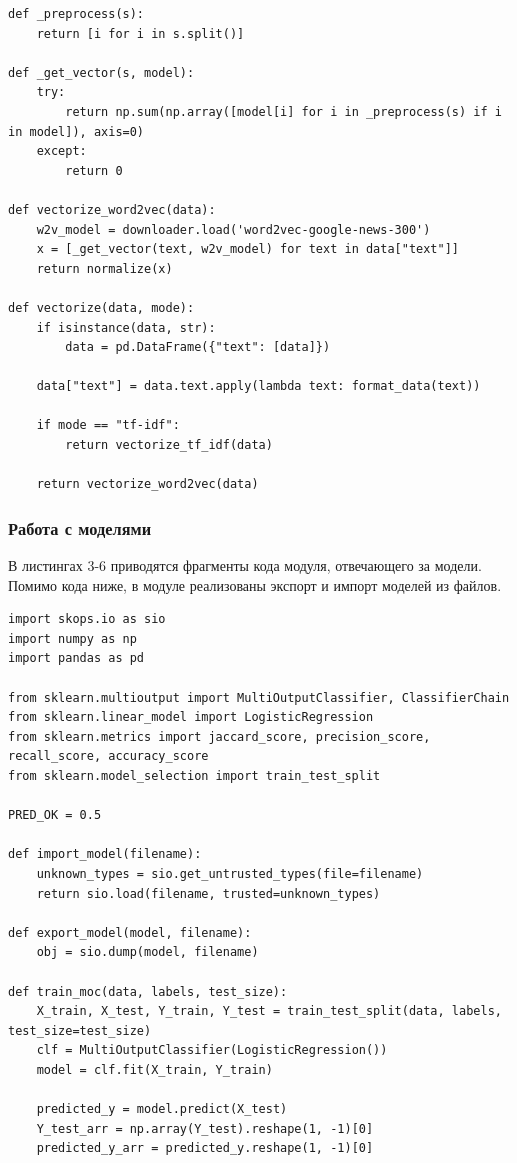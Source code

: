 \documentclass[a4paper, 12pt]{article}
\begin{document}
\begin{large}
\begin{lstlisting}[caption={Модуль обработки текста}]
def _preprocess(s):
    return [i for i in s.split()]

def _get_vector(s, model):
    try:
        return np.sum(np.array([model[i] for i in _preprocess(s) if i in model]), axis=0)
    except:
        return 0

def vectorize_word2vec(data):
    w2v_model = downloader.load('word2vec-google-news-300')
    x = [_get_vector(text, w2v_model) for text in data["text"]]
    return normalize(x)

def vectorize(data, mode):
    if isinstance(data, str):
        data = pd.DataFrame({"text": [data]})
    
    data["text"] = data.text.apply(lambda text: format_data(text))

    if mode == "tf-idf":
        return vectorize_tf_idf(data)

    return vectorize_word2vec(data)    
\end{lstlisting}

\subsubsection{Работа с моделями}
В листингах 3-6 приводятся фрагменты кода модуля, отвечающего за модели.
Помимо кода ниже, в модуле реализованы экспорт и импорт моделей из файлов.
\newpage
\begin{lstlisting}[caption={Обучение независимых классификаторов}]
import skops.io as sio
import numpy as np
import pandas as pd

from sklearn.multioutput import MultiOutputClassifier, ClassifierChain
from sklearn.linear_model import LogisticRegression
from sklearn.metrics import jaccard_score, precision_score, recall_score, accuracy_score
from sklearn.model_selection import train_test_split

PRED_OK = 0.5

def import_model(filename):
    unknown_types = sio.get_untrusted_types(file=filename)
    return sio.load(filename, trusted=unknown_types)

def export_model(model, filename):
    obj = sio.dump(model, filename)

def train_moc(data, labels, test_size):
    X_train, X_test, Y_train, Y_test = train_test_split(data, labels, test_size=test_size)
    clf = MultiOutputClassifier(LogisticRegression())
    model = clf.fit(X_train, Y_train)

    predicted_y = model.predict(X_test)
    Y_test_arr = np.array(Y_test).reshape(1, -1)[0]
    predicted_y_arr = predicted_y.reshape(1, -1)[0]


\end{lstlisting}
\end{large}
\end{document}
